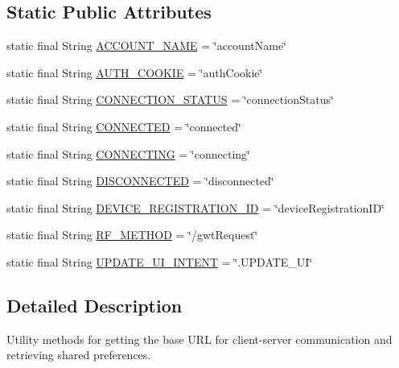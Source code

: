 \subsection*{Static Public Attributes}
\begin{DoxyCompactItemize}
\item 
static final String \hyperlink{classcsc440_1_1nuf_1_1_util_a40b66c29439ea7980ebe035fc1f33547}{A\-C\-C\-O\-U\-N\-T\-\_\-\-N\-A\-M\-E} = \char`\"{}account\-Name\char`\"{}
\item 
static final String \hyperlink{classcsc440_1_1nuf_1_1_util_a5261d5e5a553256bbe76b2fbee31c909}{A\-U\-T\-H\-\_\-\-C\-O\-O\-K\-I\-E} = \char`\"{}auth\-Cookie\char`\"{}
\item 
static final String \hyperlink{classcsc440_1_1nuf_1_1_util_ae827ff85c7a597b88b411a982eb41ad7}{C\-O\-N\-N\-E\-C\-T\-I\-O\-N\-\_\-\-S\-T\-A\-T\-U\-S} = \char`\"{}connection\-Status\char`\"{}
\item 
static final String \hyperlink{classcsc440_1_1nuf_1_1_util_a0f9fe311a7c4baf4d5a0f373839aaf6e}{C\-O\-N\-N\-E\-C\-T\-E\-D} = \char`\"{}connected\char`\"{}
\item 
static final String \hyperlink{classcsc440_1_1nuf_1_1_util_a5d1dcaf2bd94bf0d3e20aa24db16f7b3}{C\-O\-N\-N\-E\-C\-T\-I\-N\-G} = \char`\"{}connecting\char`\"{}
\item 
static final String \hyperlink{classcsc440_1_1nuf_1_1_util_acc59e40c430a78ba6bb0cc45bd616c2b}{D\-I\-S\-C\-O\-N\-N\-E\-C\-T\-E\-D} = \char`\"{}disconnected\char`\"{}
\item 
static final String \hyperlink{classcsc440_1_1nuf_1_1_util_a19e590891af91bcb18ce096826a637d9}{D\-E\-V\-I\-C\-E\-\_\-\-R\-E\-G\-I\-S\-T\-R\-A\-T\-I\-O\-N\-\_\-\-I\-D} = \char`\"{}device\-Registration\-I\-D\char`\"{}
\item 
static final String \hyperlink{classcsc440_1_1nuf_1_1_util_a168e27d595b96d0e784d5f32a6f5e125}{R\-F\-\_\-\-M\-E\-T\-H\-O\-D} = \char`\"{}/gwt\-Request\char`\"{}
\item 
static final String \hyperlink{classcsc440_1_1nuf_1_1_util_a3376e622f91a209d996ed066878f3ff5}{U\-P\-D\-A\-T\-E\-\_\-\-U\-I\-\_\-\-I\-N\-T\-E\-N\-T} = \char`\"{}.U\-P\-D\-A\-T\-E\-\_\-\-U\-I\char`\"{}
\end{DoxyCompactItemize}


\subsection{Detailed Description}
Utility methods for getting the base U\-R\-L for client-\/server communication and retrieving shared preferences. 

